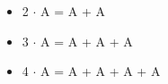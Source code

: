 \begin{itemize}
    \item[] 2 $\cdot$ A = A + A
    \item[] 3 $\cdot$ A = A + A + A
    \item[] 4 $\cdot$ A = A + A + A + A
\end{itemize}

